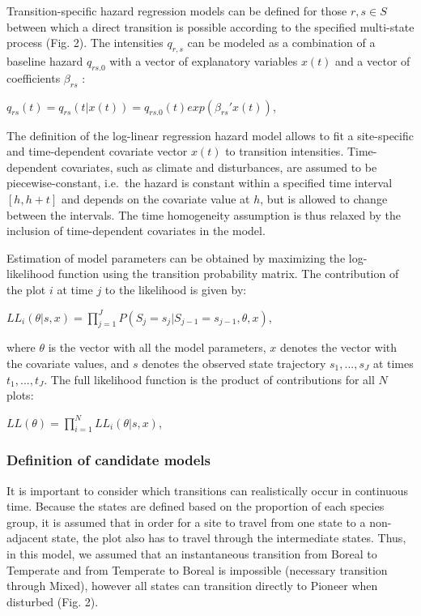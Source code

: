 \documentclass[a4paperpaper,]{article}
\begin{document}
Transition-specific hazard regression models can be defined for those
\(r,s \in S\) between which a direct transition is possible according to
the specified multi-state process (Fig. 2). The intensities \(q_{r,s}\)
can be modeled as a combination of a baseline hazard \(q_{rs.0}\) with a
vector of explanatory variables \(x(t)\) and a vector of coefficients
\(\beta_{rs}\) :

\(q_{rs}(t) = q_{rs}(t|x(t)) = q_{rs.0}(t)exp(\beta_{rs}'x(t))\),

The definition of the log-linear regression hazard model allows to fit a
site-specific and time-dependent covariate vector \(x(t)\) to transition
intensities. Time-dependent covariates, such as climate and
disturbances, are assumed to be piecewise-constant, i.e.~the hazard is
constant within a specified time interval \([h, h+t]\) and depends on
the covariate value at \(h\), but is allowed to change between the
intervals. The time homogeneity assumption is thus relaxed by the
inclusion of time-dependent covariates in the model.

Estimation of model parameters can be obtained by maximizing the
log-likelihood function using the transition probability matrix. The
contribution of the plot \(i\) at time \(j\) to the likelihood is given
by:

\(LL_i(\theta | s,x) = \prod\limits_{j=1}^{J} P(S_j=s_j|S_{j-1}=s_{j-1},\theta,x)\),

where \(\theta\) is the vector with all the model parameters, \(x\)
denotes the vector with the covariate values, and \(s\) denotes the
observed state trajectory \(s_1,...,s_J\) at times \(t_1,...,t_J\). The
full likelihood function is the product of contributions for all \(N\)
plots:

\(LL(\theta) = \prod\limits_{i=1}^{N} LL_i(\theta | s,x)\),

\hypertarget{definition-of-candidate-models}{%
\subsubsection{Definition of candidate
models}\label{definition-of-candidate-models}}

It is important to consider which transitions can realistically occur in
continuous time. Because the states are defined based on the proportion
of each species group, it is assumed that in order for a site to travel
from one state to a non-adjacent state, the plot also has to travel
through the intermediate states. Thus, in this model, we assumed that an
instantaneous transition from Boreal to Temperate and from Temperate to
Boreal is impossible (necessary transition through Mixed), however all
states can transition directly to Pioneer when disturbed (Fig. 2).
\end{document}
